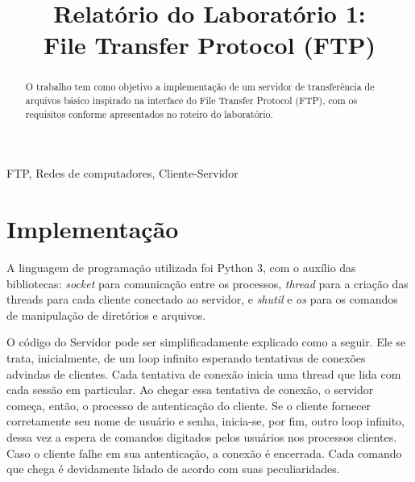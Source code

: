 \documentclass[conference]{IEEEtran}
\begin{document}
\title{Relatório do Laboratório 1: \\ File Transfer Protocol (FTP)\\
}

\author{
}

\maketitle

\begin{abstract}
O trabalho tem como objetivo a implementação de um servidor de transferência de arquivos básico inspirado na interface do File Transfer Protocol (FTP), com os requisitos conforme apresentados no roteiro do laboratório.
\end{abstract}

\begin{IEEEkeywords}
FTP, Redes de computadores, Cliente-Servidor
\end{IEEEkeywords}

\section{Implementação}\label{implementacao}

A linguagem de programação utilizada foi Python 3, com o auxílio das bibliotecas: \textit{socket} para comunicação entre os processos, \textit{thread} para a criação das threads para cada cliente conectado ao servidor, e \textit{shutil} e \textit{os} para os comandos de manipulação de diretórios e arquivos.

O código do Servidor pode ser simplificadamente explicado como a seguir. Ele se trata, inicialmente, de um loop infinito esperando tentativas de conexões advindas de clientes. Cada tentativa de conexão inicia uma thread que lida com cada sessão em particular. Ao chegar essa tentativa de conexão, o servidor começa, então, o processo de autenticação do cliente. Se o cliente fornecer corretamente seu nome de usuário e senha, inicia-se, por fim, outro loop infinito, dessa vez a espera de comandos digitados pelos usuários nos processos clientes. Caso o cliente falhe em sua antenticação, a conexão é encerrada. Cada comando que chega é devidamente lidado de acordo com suas peculiaridades.
\end{document}
